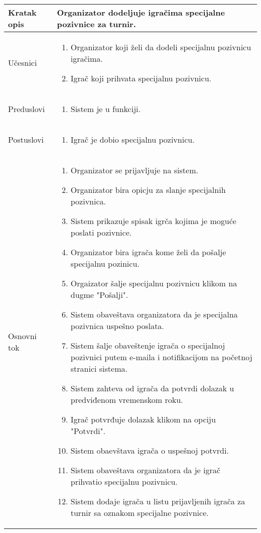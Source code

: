 \documentclass{article}
\begin{document}
\begin{longtable}{| p{} | p{} |} 
\hline
    Kratak opis & Organizator dodeljuje igračima specijalne pozivnice za turnir.\\ 
\hline    
    Učesnici & \begin{enumerate}
        \item Organizator koji želi da dodeli specijalnu pozivnicu igračima.
        \item Igrač koji prihvata specijalnu pozivnicu.
    \end{enumerate}
    \\
\hline
   Preduslovi & \begin{enumerate}
       \item Sistem je u funkciji.
   \end{enumerate}\\
\hline  
    Postuslovi & \begin{enumerate}
        \item Igrač je dobio specijalnu pozivnicu.
    \end{enumerate}\\
\hline
    Osnovni tok & \begin{enumerate}
        \item Organizator se prijavljuje na sistem.
        \item Organizator bira opicju za slanje specijalnih pozivnica.
        \item Sistem prikazuje spisak igrča kojima je moguće poslati pozivnice.
        \item Organizator bira igrača kome želi da pošalje specijalnu pozinicu.
        \item Orgaizator šalje specijalnu pozivnicu klikom na dugme "Pošalji".
        \item Sistem obaveštava organizatora da je specijalna pozivnica uspešno poslata.
        \item Sistem šalje obaveštenje igrača o specijalnoj pozivnici putem e-maila i notifikacijom na početnoj stranici sistema.
        \item Sistem zahteva od igrača da potvrdi dolazak u predviđenom vremenskom roku.
        \item Igrač potvrđuje dolazak klikom na opciju "Potvrdi".
        \item Sistem obaevštava igrača o uspešnoj potvrdi.
        \item Sistem obaveštava organizatora da je igrač prihvatio specijalnu pozivnicu.
        \item Sistem dodaje igrača u listu prijavljenih igrača za turnir sa oznakom specijalne pozivnice.
        

\end{enumerate}
\end{longtable}
\end{document}
